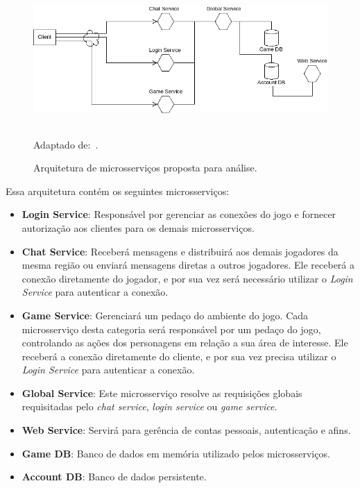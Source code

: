 \begin{figure}[htb!]
\caption{Arquitetura de microsserviços proposta para análise.}
\label{fig:salz}
\includegraphics[height=5cm]{img/cap3/salz.png}
\centering

Adaptado de:~\cite{albion_online_unite}.
\end{figure}



Essa arquitetura contém os seguintes microsserviços:

\begin{itemize}
  \item \textbf{Login Service}: Responsável por gerenciar as conexões do jogo e fornecer autorização aos clientes para os demais microsserviços.
  \item \textbf{Chat Service}: Receberá mensagens e distribuirá aos demais jogadores da mesma região ou enviará mensagens diretas a outros jogadores. Ele receberá a conexão diretamente do jogador, e por sua vez será necessário utilizar o \textit{Login Service} para autenticar a conexão.
  \item \textbf{Game Service}: Gerenciará um pedaço do ambiente do jogo. Cada microsserviço desta categoria será responsável por um pedaço do jogo, controlando as ações dos personagens em relação a sua área de interesse. Ele receberá a conexão diretamente do cliente, e por sua vez precisa utilizar o \textit{Login Service} para autenticar a conexão.
  \item \textbf{Global Service}: Este microsserviço resolve as requisições globais requisitadas pelo \textit{chat service}, \textit{login service} ou \textit{game service}.
  \item \textbf{Web Service}: Servirá para gerência de contas pessoais, autenticação e afins.
  \item \textbf{Game DB}: Banco de dados em memória utilizado pelos microsserviços.
  \item \textbf{Account DB}: Banco de dados persistente.
\end{itemize}


